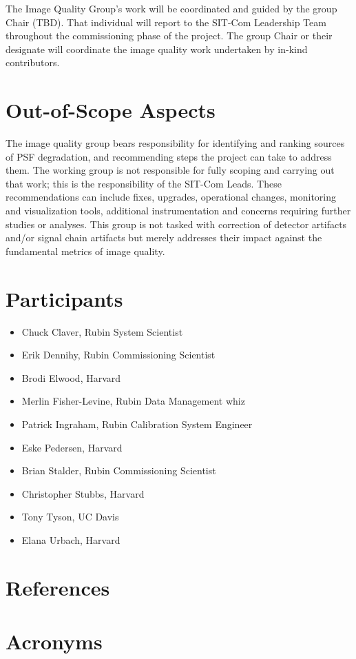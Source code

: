 \documentclass[SE,authoryear,toc]{lsstdoc}
\begin{document}
The Image Quality Group's work will be coordinated and guided by the group Chair (TBD).
That individual will report to the SIT-Com Leadership Team throughout the commissioning phase of the project.
The group Chair or their designate will coordinate the image quality work undertaken by in-kind contributors.

\section{Out-of-Scope Aspects}
\label{sec:out_of_scope}

The image quality group bears responsibility for identifying and ranking sources of PSF degradation, and recommending steps the project can take to address them.
The working group is not responsible for fully scoping and carrying out that work; this is the responsibility of the SIT-Com Leads.
These recommendations can include fixes, upgrades, operational changes, monitoring and visualization tools, additional instrumentation and concerns requiring further studies or analyses.
This group is not tasked with correction of detector artifacts and/or signal chain artifacts but merely addresses their impact against the fundamental metrics of image quality.

\section{Participants}
\label{sec:participants}

\begin{itemize}
\item Chuck Claver, Rubin System Scientist
\item Erik Dennihy, Rubin Commissioning Scientist
\item Brodi Elwood, Harvard
\item Merlin Fisher-Levine, Rubin Data Management whiz
\item Patrick Ingraham, Rubin Calibration System Engineer
\item Eske Pedersen, Harvard
\item Brian Stalder, Rubin Commissioning Scientist
\item Christopher Stubbs, Harvard
\item Tony Tyson, UC Davis
\item Elana Urbach, Harvard
\end{itemize}


\appendix
\section{References} \label{sec:bib}
\renewcommand{\refname}{} %
%

\section{Acronyms} \label{sec:acronyms}

\end{document}
